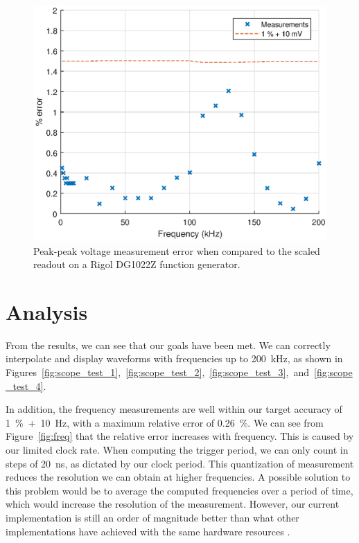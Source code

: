 \documentclass[journal]{IEEEtran}
\begin{document}
\begin{figure}[!htb]
  \centering
  \includegraphics[width=\columnwidth]{test-results/voltpp.eps}
  \caption{Peak-peak voltage measurement error when compared to the scaled readout on a Rigol DG1022Z function generator.}
  \label{fig:voltpp}
\end{figure}

\section{Analysis}

From the results, we can see that our goals have been met. We can correctly interpolate and display waveforms with frequencies up to 200~kHz, as shown in Figures~\ref{fig:scope_test_1},~\ref{fig:scope_test_2},~\ref{fig:scope_test_3},~and~\ref{fig:scope_test_4}.

In addition, the frequency measurements are well within our target accuracy of 1~\%~+~10~Hz, with a maximum relative error of 0.26~\%. We can see from Figure~\ref{fig:freq} that the relative error increases with frequency. This is caused by our limited clock rate. When computing the trigger period, we can only count in steps of 20~ns, as dictated by our clock period. This quantization of measurement reduces the resolution we can obtain at higher frequencies. A possible solution to this problem would be to average the computed frequencies over a period of time, which would increase the resolution of the measurement. However, our current implementation is still an order of magnitude better than what other implementations have achieved with the same hardware resources \cite{jin_digital_2016}.
\end{document}
